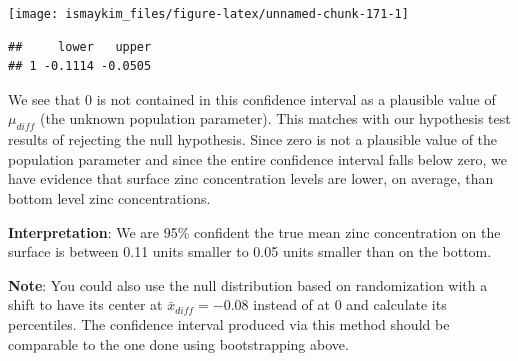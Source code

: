 \documentclass[]{tufte-book}
\newenvironment{Shaded}{\begin{snugshade}}{\end{snugshade}}
\newcommand{\KeywordTok}[1]{\textcolor[rgb]{0.13,0.29,0.53}{\textbf{{#1}}}}
\newcommand{\DataTypeTok}[1]{\textcolor[rgb]{0.13,0.29,0.53}{{#1}}}
\newcommand{\DecValTok}[1]{\textcolor[rgb]{0.00,0.00,0.81}{{#1}}}
\newcommand{\FloatTok}[1]{\textcolor[rgb]{0.00,0.00,0.81}{{#1}}}
\newcommand{\StringTok}[1]{\textcolor[rgb]{0.31,0.60,0.02}{{#1}}}
\newcommand{\NormalTok}[1]{{#1}}
\begin{document}
\begin{Shaded}
\end{Shaded}

\begin{center}\texttt{[image: ismaykim\_files/figure-latex/unnamed-chunk-171-1]} \end{center}

\begin{Shaded}
\end{Shaded}

\begin{verbatim}
##     lower   upper
## 1 -0.1114 -0.0505
\end{verbatim}

We see that 0 is not contained in this confidence interval as a
plausible value of \(\mu_{diff}\) (the unknown population parameter).
This matches with our hypothesis test results of rejecting the null
hypothesis. Since zero is not a plausible value of the population
parameter and since the entire confidence interval falls below zero, we
have evidence that surface zinc concentration levels are lower, on
average, than bottom level zinc concentrations.

\textbf{Interpretation}: We are 95\% confident the true mean zinc
concentration on the surface is between 0.11 units smaller to 0.05 units
smaller than on the bottom.

\textbf{Note}: You could also use the null distribution based on
randomization with a shift to have its center at
\(\bar{x}_{diff} = -0.08\) instead of at 0 and calculate its
percentiles. The confidence interval produced via this method should be
comparable to the one done using bootstrapping above.
\end{document}
